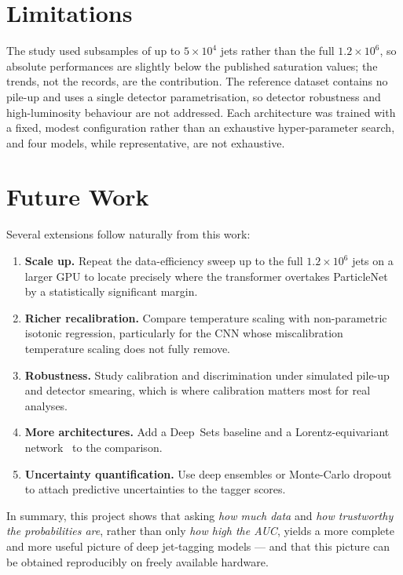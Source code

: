\section{Limitations}
\label{sec:limitations}

The study used subsamples of up to $5\times10^{4}$ jets rather than the full
$1.2\times10^{6}$, so absolute performances are slightly below the published
saturation values; the trends, not the records, are the contribution. The
reference dataset contains no pile-up and uses a single detector
parametrisation, so detector robustness and high-luminosity behaviour are not
addressed. Each architecture was trained with a fixed, modest configuration
rather than an exhaustive hyper-parameter search, and four models, while
representative, are not exhaustive.

\section{Future Work}
\label{sec:future}

Several extensions follow naturally from this work:
\begin{enumerate}
    \item \textbf{Scale up.} Repeat the data-efficiency sweep up to the full
    $1.2\times10^{6}$ jets on a larger GPU to locate precisely where the
    transformer overtakes ParticleNet by a statistically significant margin.
    \item \textbf{Richer recalibration.} Compare temperature scaling with
    non-parametric isotonic regression, particularly for the CNN whose
    miscalibration temperature scaling does not fully remove.
    \item \textbf{Robustness.} Study calibration and discrimination under
    simulated pile-up and detector smearing, which is where calibration
    matters most for real analyses.
    \item \textbf{More architectures.} Add a Deep~Sets baseline and a
    Lorentz-equivariant network~\citep{gong2022lorentznet} to the comparison.
    \item \textbf{Uncertainty quantification.} Use deep ensembles or
    Monte-Carlo dropout to attach predictive uncertainties to the tagger
    scores.
\end{enumerate}

In summary, this project shows that asking \emph{how much data} and
\emph{how trustworthy the probabilities are}, rather than only \emph{how
high the AUC}, yields a more complete and more useful picture of deep
jet-tagging models --- and that this picture can be obtained reproducibly on
freely available hardware.
